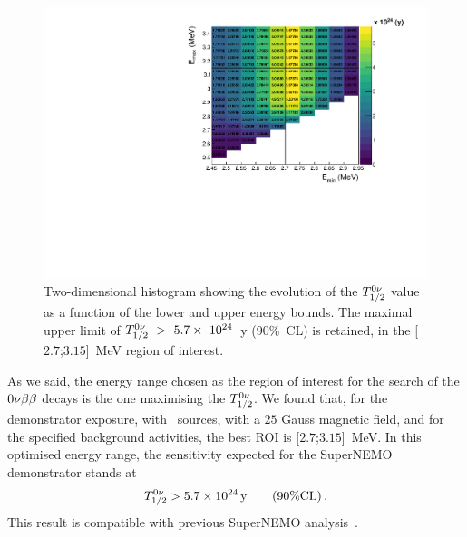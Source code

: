 \begin{figure}[h]
  \centering
  \includegraphics[width=1.1\textwidth]{Sensitivity/fig_sensitivity/sensitivity_spectrum_with_B_82Se.pdf}
  \caption{Two-dimensional histogram showing the evolution of the $T_{1/2}^{0\nu}$ value as a function of the lower and upper energy bounds.
    The maximal upper limit of $T_{1/2}^{0\nu}~>~5.7\times~10^{24}$~y (90\%~CL) is retained, in the [$2.7$;$3.15$]~MeV region of interest.
    \label{fig:sensitivity_cont}}
\end{figure}
As we said, the energy range chosen as the region of interest for the search of the $0\nu\beta\beta$ decays is the one maximising the $T_{1/2}^{0\nu}$.
We found that, for the demonstrator exposure, with \Se\ sources, with a $25$ Gauss magnetic field, and for the specified background activities, the best ROI is [$2.7$;$3.15$]~MeV.
In this optimised energy range, the sensitivity expected for the SuperNEMO demonstrator stands at
\begin{equation}
T_{1/2}^{0\nu} > 5.7\times 10^{24}\,\text{y}\qquad (90\% \text{CL})\,.
\end{equation}
This result is compatible with previous SuperNEMO analysis~\cite{CalvezThesis}.


